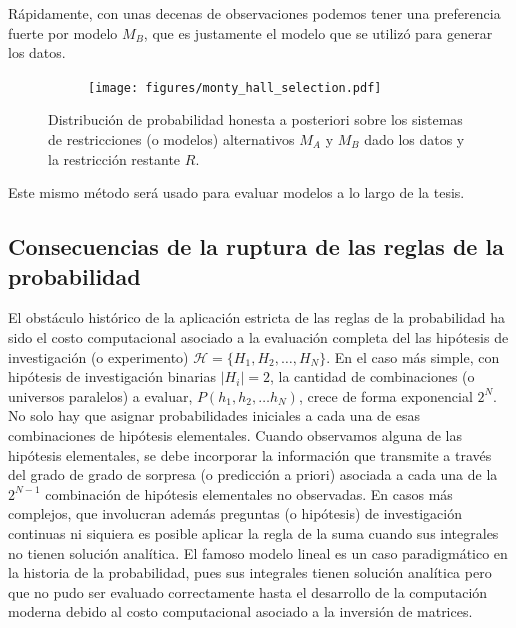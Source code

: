 \documentclass[a4paper,11pt]{book}
\theoremstyle{definition}
\begin{document}

R\'apidamente, con unas decenas de observaciones podemos tener una preferencia fuerte por modelo $M_B$, que es justamente el modelo que se utiliz\'o para generar los datos.
%
\begin{figure}[H]
    \centering
    \begin{subfigure}[b]{0.45\textwidth}
    \texttt{[image: figures/monty\_hall\_selection.pdf]}
    \end{subfigure}
    \caption{
    Distribuci\'on de probabilidad honesta a posteriori sobre los sistemas de restricciones (o modelos) alternativos $M_A$ y $M_B$ dado los datos y la restricci\'on restante $R$.
    }
    \label{fig:monty_hall_selection}
\end{figure}
%
Este mismo m\'etodo ser\'a usado para evaluar modelos a lo largo de la tesis.


\subsection{Consecuencias de la ruptura de las reglas de la probabilidad}

El obst\'aculo hist\'orico de la aplicaci\'on estricta de las reglas de la probabilidad ha sido el costo computacional asociado a la evaluaci\'on completa del las hip\'otesis de investigaci\'on (o experimento) $\mathcal{H} = \{H_1, H_2, \dots, H_N\}$.
%
En el caso m\'as simple, con hip\'otesis de investigaci\'on binarias $|H_i|=2$, la cantidad de combinaciones (o universos paralelos) a evaluar, $P(h_1, h_2, \dots h_N)$, crece de forma exponencial $2^N$.
%
No solo hay que asignar probabilidades iniciales a cada una de esas combinaciones de hip\'otesis elementales.
%
Cuando observamos alguna de las hip\'otesis elementales, se debe incorporar la informaci\'on que transmite a trav\'es del grado de grado de sorpresa (o predicci\'on a priori) asociada a cada una de la $2^{N-1}$ combinaci\'on de hip\'otesis elementales no observadas.
%
En casos m\'as complejos, que involucran adem\'as preguntas (o hip\'otesis) de investigaci\'on continuas ni siquiera es posible aplicar la regla de la suma cuando sus integrales no tienen soluci\'on anal\'itica.
%
El famoso modelo lineal es un caso paradigm\'atico en la historia de la probabilidad, pues sus integrales tienen soluci\'on anal\'itica pero que no pudo ser evaluado correctamente hasta el desarrollo de la computaci\'on moderna debido al costo computacional asociado a la inversi\'on de matrices.

%
\end{document}
